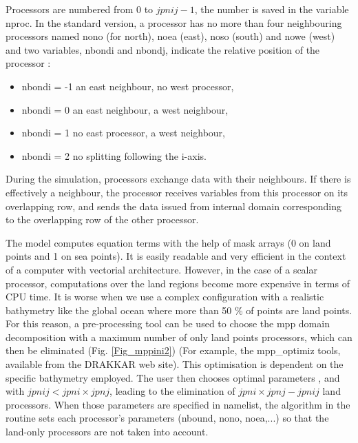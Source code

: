 \documentclass[NEMO_book]{subfiles}
\begin{document}
Processors are numbered from 0 to $jpnij-1$, the number is saved in the variable 
nproc. In the standard version, a processor has no more than four neighbouring 
processors named nono (for north), noea (east), noso (south) and nowe (west) 
and two variables, nbondi and nbondj, indicate the relative position of the processor :
\begin{itemize}
\item 		nbondi = -1 	an east neighbour, no west processor,
\item 		nbondi =  0	an east neighbour, a west neighbour,
\item 		nbondi =  1 	no east processor, a west neighbour,
\item 		nbondi =  2 	no splitting following the i-axis.
\end{itemize}
During the simulation, processors exchange data with their neighbours. 
If there is effectively a neighbour, the processor receives variables from this 
processor on its overlapping row, and sends the data issued from internal 
domain corresponding to the overlapping row of the other processor.


The \NEMO model computes equation terms with the help of mask arrays (0 on land 
points and 1 on sea points). It is easily readable and very efficient in the context of 
a computer with vectorial architecture. However, in the case of a scalar processor, 
computations over the land regions become more expensive in terms of CPU time. 
It is worse when we use a complex configuration with a realistic bathymetry like the 
global ocean where more than 50 \% of points are land points. For this reason, a 
pre-processing tool can be used to choose the mpp domain decomposition with a 
maximum number of only land points processors, which can then be eliminated (Fig. \ref{Fig_mppini2})
(For example, the mpp\_optimiz tools, available from the DRAKKAR web site). 
This optimisation is dependent on the specific bathymetry employed. The user 
then chooses optimal parameters ,  and  with 
$jpnij < jpni \times jpnj$, leading to the elimination of $jpni \times jpnj - jpnij$ 
land processors. When those parameters are specified in  namelist, 
the algorithm in the  routine sets each processor's parameters (nbound, 
nono, noea,...) so that the land-only processors are not taken into account. 

\end{document}

